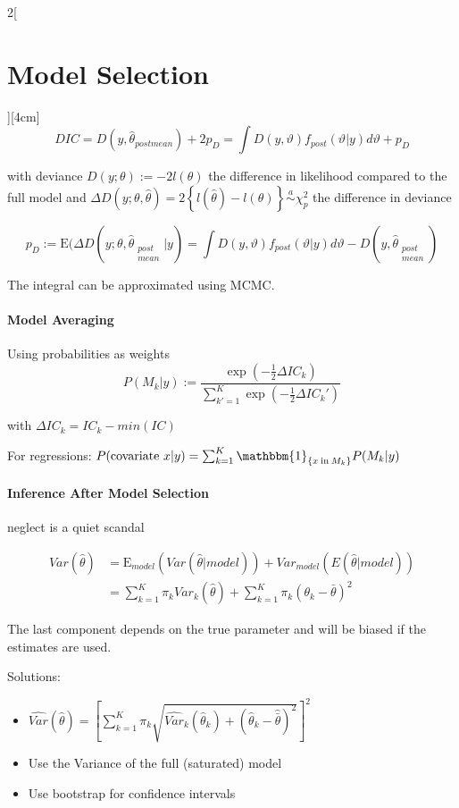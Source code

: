 \documentclass[8pt]{extarticle}
\begin{document}
\begin{multicols}{2}[\section{Model Selection}][4cm]
$$DIC = D(y,\hat{\theta}_{postmean}) + 2p_D = \int D(y,\vartheta)f_{post}(\vartheta|y)d\vartheta + p_D$$

\noindent with deviance $D(y;\theta) := -2l(\theta)$ the difference in likelihood compared to the full model and $\Delta D(y;\theta,\hat{\theta}) = 2\left\{l(\hat{\theta}) {-} l(\theta)\right\} \overset{a}{\sim}\chi_p^2$ the difference in deviance

$$p_D := \mathrm{E}(\Delta D(y;\theta, \hat{\theta}_{\substack{post \\ mean}}|y) = \int\!\! D(y,\vartheta)f_{post}(\vartheta|y)d\vartheta {-} D(y,\hat{\theta}_{\substack{post \\ mean}})$$

\noindent The integral can be approximated using MCMC.

\paragraph{Model Averaging} Using probabilities as weights
$$P(M_k|y) := \frac{\exp(-\frac{1}{2}\Delta IC_k)}{\sum_{k' =1}^K\exp(-\frac{1}{2}\Delta IC_k')}$$

with $\Delta IC_k = IC_k - min(IC)$

\noindent For regressions: $P(\text{covariate } x|y) = \sum_{k=1}^K \mathbbm{1}_{\{x \:\text{in}\: M_k\}}P(M_k|y)$

\paragraph{Inference After Model Selection} neglect is a quiet scandal

\begin{align*}
Var(\hat{\theta}) &= \mathrm{E}_{model}(Var(\hat{\theta}|model)) + Var_{model}(E(\hat{\theta}|model))\\
&= \sum_{k=1}^K \pi_kVar_k(\hat{\theta}) + \sum_{k=1}^K \pi_k(\theta_k-\bar{\theta})^2
\end{align*}

\noindent The last component depends on the true parameter and will be biased if the estimates are used.

Solutions:
\begin{itemize}
\item $\widehat{Var}(\hat{\theta}) = \left[ \sum_{k=1}^K \pi_k \sqrt{\widehat{Var}_k(\hat{\theta}_k) + (\hat{\theta}_k - \hat{\bar{\theta}})^2}\right]^2$
\item Use the Variance of the full (saturated) model
\item Use bootstrap for confidence intervals
\end{itemize}


\end{multicols}
\end{document}
